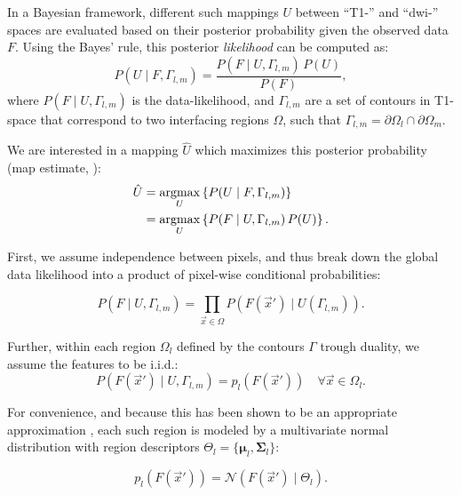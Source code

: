 In a Bayesian framework, different such mappings $U$ between ``T1-''
and ``\gls*{dwi}-'' spaces are evaluated based on their posterior
probability given the observed data $F$. Using the Bayes' rule, this
posterior \emph{likelihood} can be computed as:
\begin{equation}
P(U \mid F,\Gamma_{l,m}) = \frac{P(F \mid U,\Gamma_{l,m})\, P(U)}{P(F)},
\label{eq:bayes_rule}
\end{equation}
where $P(F \mid U,\Gamma_{l,m})$ is the data-likelihood, and
$\Gamma_{l,m}$ are a set of contours in T1-space that correspond to
two interfacing regions $\Omega$, such that
$\Gamma_{l,m} = \partial \Omega_l \cap \partial \Omega_m$.

We are interested in a mapping $\hat{U}$ which maximizes this
posterior probability (\gls*{map} estimate, \citep{bishop_pattern_2006}):
\begin{align}
\hat{U} &= \underset{U}{\argmax} \left\{ P(U \mid F,\Gamma_{l,m}) \right\} \notag\\
 &= \underset{U}{\argmax} \left\{ P(F \mid U,\Gamma_{l,m})\, P(U) \right\}.
\label{eq:map_u}
\end{align}

First, we assume independence between pixels, and thus break down the
global data likelihood into a product of pixel-wise conditional probabilities:

\begin{equation}
P(F \mid U,\Gamma_{l,m}) =
\underset{\vec{x}\in \Omega}{\prod} P\left( F(\vec{x}') \mid U(\Gamma_{l,m}) \right).
\label{eq:bayes_aposteriori}
\end{equation}

Further, within each region $\Omega_l$ defined by the contours $\Gamma$
trough duality, we assume the features to be i.i.d.:
\begin{equation}
P\left( F(\vec{x}') \mid U,\Gamma_{l,m} \right) = p_l( F(\vec{x}')) \quad
\forall \vec{x} \in \Omega_l.
\label{eq:likelihood}
\end{equation}

For convenience, and because this has been shown to be an appropriate
approximation \citep{bishop_pattern_2006}, each such region is modeled
by a multivariate normal distribution with region descriptors
$\Theta_l = \lbrace \boldsymbol{\mu}_l, \boldsymbol{\Sigma}_{l} \rbrace$:

\begin{equation}
p_l( F(\vec{x}') ) = \mathcal{N} \left( F(\vec{x}') \mid \Theta_l \right).
\label{eq:multivariate_normal}
\end{equation}

